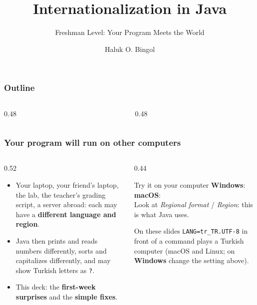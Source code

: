 \documentclass[aspectratio=169,10pt,compress]{beamer}
\title{Internationalization in Java}
\subtitle{Freshman Level: Your Program Meets the World}
\author[Bingol]{Haluk O. Bingol}
\institute[FCIS]{
    Faculty of Computer and Information Sciences\\
    Yeditepe University
}
\date{
	{\tiny \hbTimeStamp}
}
\newcommand{\win}{\textbf{Windows}}
\newcommand{\mac}{\textbf{macOS}}
\begin{document}
\begin{frame}[t,fragile]
  \titlepage
\end{frame}




\begin{frame}[t,fragile] \frametitle{Outline}
  \begin{columns}[T]
    \begin{column}{0.48\textwidth}
      \tableofcontents[sections={1-3}, hideallsubsections]
    \end{column}
    \begin{column}{0.48\textwidth}
      \tableofcontents[sections={4-20}, hideallsubsections]
    \end{column}
  \end{columns}
\end{frame}




\begin{frame}[t,fragile] \frametitle{Your program will run on other computers}
  \begin{columns}[T]
    \begin{column}{0.52\textwidth}
      \begin{itemize}\small
        \item Your laptop, your friend's laptop, the lab, the teacher's grading script, a server abroad:
          each may have a \textbf{different language and region}.
        \item Java then prints and reads numbers differently, sorts and capitalizes differently,
          and may show Turkish letters as \texttt{?}.
        \item This deck: the \textbf{first-week surprises} and the \textbf{simple fixes}.
      \end{itemize}
    \end{column}
    \begin{column}{0.44\textwidth}
      \begin{block}{Try it on your computer}
        \small
        \win: \\[0.3em]
        \mac: \\[0.3em]
        Look at \emph{Regional format} / \emph{Region}: this is what Java uses.
      \end{block}
      \small On these slides \texttt{LANG=tr\_TR.UTF-8} in front of a command plays a Turkish computer
      (macOS and Linux; on \win{} change the setting above).
    \end{column}
  \end{columns}
\end{frame}
\end{document}
